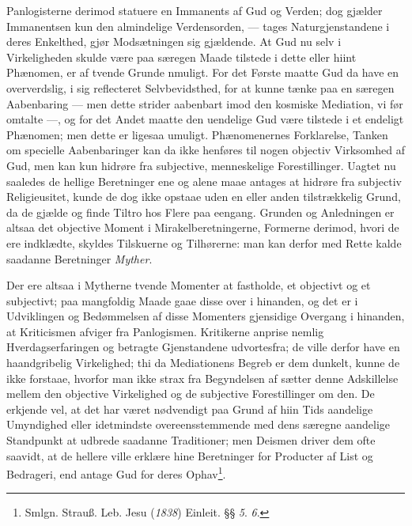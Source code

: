 \documentclass[12pt]{book}
\newcommand{\opage}[1]{\marginnote{\footnotesize\textit{[#1]}}}
\begin{document}
Panlogisterne derimod statuere en Immanents af Gud og Verden; dog gjælder
Immanentsen kun den almindelige Verdensorden, --- tages Naturgjenstandene i
deres Enkelthed, gjør Modsætningen sig gjældende. At Gud nu selv i
Virkeligheden skulde være paa særegen Maade tilstede i dette eller hiint
Phænomen, er af tvende Grunde nmuligt. For det Første maatte Gud da have en
oververdslig, i sig reflecteret Selvbevidsthed, for at kunne tænke paa en
særegen Aabenbaring --- men dette strider aabenbart imod den kosmiske
Mediation, vi før omtalte ---, og for det Andet maatte den uendelige Gud være
tilstede i et endeligt Phænomen; men dette er ligesaa umuligt. Phænomenernes
Forklarelse, Tanken om specielle Aabenbaringer kan da ikke henføres til nogen
objectiv Virksomhed af Gud, men kan kun hidrøre fra subjective, menneskelige
Forestillinger. Uagtet nu saaledes de hellige Beretninger ene og alene maae
antages at hidrøre fra subjectiv Religieusitet, kunde de dog ikke opstaae uden
en eller anden tilstrækkelig Grund, da de gjælde og finde Tiltro hos Flere paa
eengang. Grunden og Anledningen er altsaa
\opage{131} \setcounter{footnote}{0}%
det objective Moment i Mirakelberetningerne, Formerne derimod, hvori de ere
indklædte, skyldes Tilskuerne og Tilhørerne: man kan derfor med Rette kalde
saadanne Beretninger \emph{Myther}.

Der ere altsaa i Mytherne tvende Momenter at fastholde, et objectivt og et
subjectivt; paa mangfoldig Maade gaae disse over i hinanden, og det er i
Udviklingen og Bedømmelsen af disse Momenters gjensidige Overgang i hinanden,
at Kriticismen afviger fra Panlogismen. Kritikerne anprise nemlig
Hverdagserfaringen og betragte Gjenstandene udvortesfra; de ville derfor have
en haandgribelig Virkelighed; thi da Mediationens Begreb er dem dunkelt, kunne
de ikke forstaae, hvorfor man ikke strax fra Begyndelsen af sætter denne
Adskillelse mellem den objective Virkelighed og de subjective Forestillinger om
den. De erkjende vel, at det har været nødvendigt paa Grund af hiin Tids
aandelige Umyndighed eller idetmindste overeensstemmende med dens særegne
aandelige Standpunkt at udbrede saadanne Traditioner; men Deismen driver dem
ofte saavidt, at de hellere ville erklære hine Beretninger for Producter af
List og Bedrageri, end antage Gud for deres Ophav\footnote{Smlgn. Strauß. Leb.
Jesu (\textit{1838}) Einleit. §§ \textit{5}. \textit{6}.}.
\end{document}
